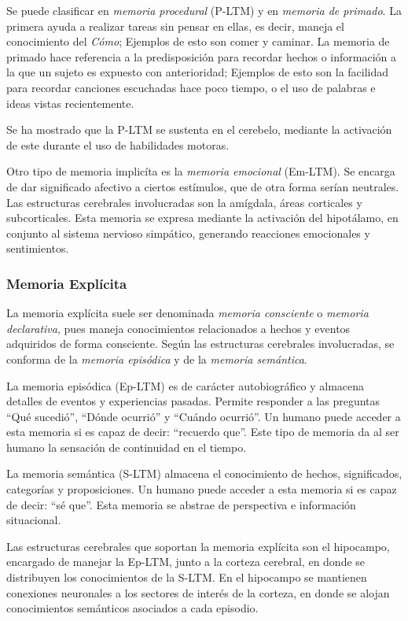 Se puede clasificar en \textit{memoria procedural} (P-LTM) y en \textit{memoria de primado}. La primera ayuda a realizar tareas sin pensar en ellas, es decir, maneja el conocimiento del \textit{C\'omo}; Ejemplos de esto son comer y caminar. La memoria de primado hace referencia a la predisposici\'on para recordar hechos o informaci\'on a la que un sujeto es expuesto con anterioridad; Ejemplos de esto son la facilidad para recordar canciones escuchadas hace poco tiempo, o el uso de palabras e ideas vistas recientemente.

Se ha mostrado que la P-LTM se sustenta en el cerebelo, mediante la activaci\'on de este durante el uso de habilidades motoras.

Otro tipo de memoria implic\'ita es la \textit{memoria emocional} (Em-LTM). Se encarga de dar significado afectivo a ciertos  est\'imulos, que de otra forma ser\'ian neutrales. Las estructuras cerebrales involucradas son la am\'igdala, \'areas corticales y subcorticales. Esta memoria se expresa mediante la activaci\'on del hipot\'alamo, en conjunto al sistema nervioso simp\'atico, generando reacciones emocionales y sentimientos.


\subsubsection{Memoria Expl\'icita}

La memoria expl\'icita suele ser denominada \textit{memoria consciente} o \textit{memoria declarativa}, pues maneja conocimientos relacionados a hechos y eventos adquiridos de forma consciente. Seg\'un las estructuras cerebrales involucradas, se conforma de la \textit{memoria epis\'odica} y de la \textit{memoria sem\'antica}.

La memoria epis\'odica (Ep-LTM) es de car\'acter  autobiogr\'afico y almacena detalles de eventos y experiencias pasadas. Permite responder a las preguntas ``Qu\'e sucedi\'o'', ``D\'onde ocurri\'o'' y ``Cu\'ando ocurri\'o''. Un humano puede acceder a esta memoria si es capaz de decir: ``recuerdo que''. Este tipo de memoria da al ser humano la sensaci\'on de continuidad en el tiempo.

La memoria sem\'antica (S-LTM) almacena el conocimiento de hechos, significados, categor\'ias y proposiciones. Un humano puede acceder a esta memoria si es capaz de decir: ``s\'e que''. Esta memoria se abstrae de perspectiva e informaci\'on situacional.

Las estructuras cerebrales que soportan la memoria expl\'icita son el hipocampo, encargado de manejar la Ep-LTM, junto a la corteza cerebral, en donde se distribuyen los conocimientos de la S-LTM. En el hipocampo se mantienen conexiones neuronales a los sectores de inter\'es de la corteza, en donde se alojan conocimientos sem\'anticos asociados a cada episodio.

